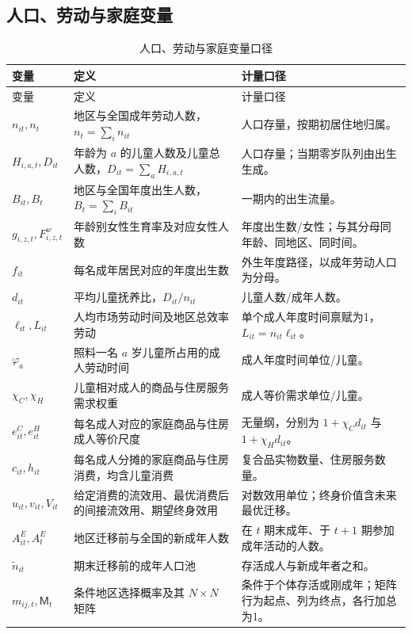 \documentclass[UTF8,a4paper,zihao=-4,fontset=windows]{ctexart}
\numberwithin{equation}{section}
\begin{document}
\normalsize

\subsection{人口、劳动与家庭变量}
\small
\begin{longtable}{L{0.23\textwidth}L{0.43\textwidth}L{0.24\textwidth}}
\caption{人口、劳动与家庭变量口径}\label{tab:notation-households}\\
\toprule
变量 & 定义 & 计量口径\\
\midrule
\endfirsthead
\toprule
变量 & 定义 & 计量口径\\
\midrule
\endhead
\bottomrule
\endfoot
$n_{it},n_t$ & 地区与全国成年劳动人数，$n_t=\sum_in_{it}$ & 人口存量，按期初居住地归属。\\
$H_{i,a,t},D_{it}$ & 年龄为 $a$ 的儿童人数及儿童总人数，$D_{it}=\sum_aH_{i,a,t}$ & 人口存量；当期零岁队列由出生生成。\\
$B_{it},B_t$ & 地区与全国年度出生人数，$B_t=\sum_iB_{it}$ & 一期内的出生流量。\\
$g_{i,z,t},F^w_{i,z,t}$ & 年龄别女性生育率及对应女性人数 & 年度出生数/女性；与其分母同年龄、同地区、同时间。\\
$f_{it}$ & 每名成年居民对应的年度出生数 & 外生年度路径，以成年劳动人口为分母。\\
$d_{it}$ & 平均儿童抚养比，$D_{it}/n_{it}$ & 儿童人数/成年人数。\\
$\ell_{it},L_{it}$ & 人均市场劳动时间及地区总效率劳动 & 单个成人年度时间禀赋为1，$L_{it}=n_{it}\ell_{it}$。\\
$\varphi_a$ & 照料一名 $a$ 岁儿童所占用的成人劳动时间 & 成人年度时间单位/儿童。\\
$\chi_C,\chi_H$ & 儿童相对成人的商品与住房服务需求权重 & 成人等价需求单位/儿童。\\
$e^C_{it},e^H_{it}$ & 每名成人对应的家庭商品与住房成人等价尺度 & 无量纲，分别为 $1+\chi_Cd_{it}$ 与 $1+\chi_Hd_{it}$。\\
$c_{it},h_{it}$ & 每名成人分摊的家庭商品与住房消费，均含儿童消费 & 复合品实物数量、住房服务数量。\\
$u_{it},v_{it},V_{it}$ & 给定消费的流效用、最优消费后的间接流效用、期望终身效用 & 对数效用单位；终身价值含未来最优迁移。\\
$A^E_{it},A^E_t$ & 地区迁移前与全国的新成年人数 & 在 $t$ 期末成年、于 $t+1$ 期参加成年活动的人数。\\
$\widetilde n_{it}$ & 期末迁移前的成年人口池 & 存活成人与新成年者之和。\\
$m_{ij,t},\mathsf M_t$ & 条件地区选择概率及其 $N\times N$ 矩阵 & 条件于个体存活或刚成年；矩阵行为起点、列为终点，各行加总为1。\\

\end{longtable}
\end{document}
